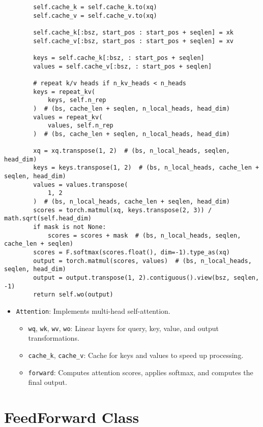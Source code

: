 \begin{lstlisting}
        self.cache_k = self.cache_k.to(xq)
        self.cache_v = self.cache_v.to(xq)

        self.cache_k[:bsz, start_pos : start_pos + seqlen] = xk
        self.cache_v[:bsz, start_pos : start_pos + seqlen] = xv

        keys = self.cache_k[:bsz, : start_pos + seqlen]
        values = self.cache_v[:bsz, : start_pos + seqlen]

        # repeat k/v heads if n_kv_heads < n_heads
        keys = repeat_kv(
            keys, self.n_rep
        )  # (bs, cache_len + seqlen, n_local_heads, head_dim)
        values = repeat_kv(
            values, self.n_rep
        )  # (bs, cache_len + seqlen, n_local_heads, head_dim)

        xq = xq.transpose(1, 2)  # (bs, n_local_heads, seqlen, head_dim)
        keys = keys.transpose(1, 2)  # (bs, n_local_heads, cache_len + seqlen, head_dim)
        values = values.transpose(
            1, 2
        )  # (bs, n_local_heads, cache_len + seqlen, head_dim)
        scores = torch.matmul(xq, keys.transpose(2, 3)) / math.sqrt(self.head_dim)
        if mask is not None:
            scores = scores + mask  # (bs, n_local_heads, seqlen, cache_len + seqlen)
        scores = F.softmax(scores.float(), dim=-1).type_as(xq)
        output = torch.matmul(scores, values)  # (bs, n_local_heads, seqlen, head_dim)
        output = output.transpose(1, 2).contiguous().view(bsz, seqlen, -1)
        return self.wo(output)
\end{lstlisting}

\begin{itemize}
    \item \texttt{Attention}: Implements multi-head self-attention.
    \begin{itemize}
        \item \texttt{wq}, \texttt{wk}, \texttt{wv}, \texttt{wo}: Linear layers for query, key, value, and output transformations.
        \item \texttt{cache\_k}, \texttt{cache\_v}: Cache for keys and values to speed up processing.
        \item \texttt{forward}: Computes attention scores, applies softmax, and computes the final output.
    \end{itemize}
\end{itemize}

\section{FeedForward Class}

